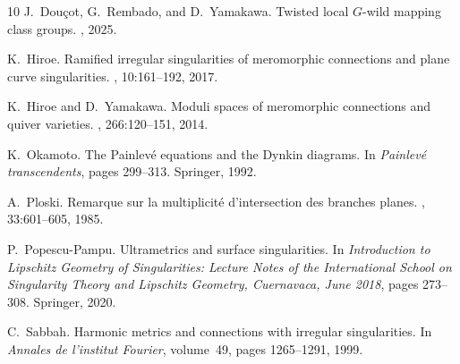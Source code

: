 \documentclass[11pt,a4paper]{amsart}
\numberwithin{equation}{section}
\begin{document}
\begin{thebibliography}{10}
J.~Dou{\c{c}}ot, G.~Rembado, and D.~Yamakawa.
\newblock Twisted local {$G$}-wild mapping class groups.
, 2025.

K.~Hiroe.
\newblock Ramified irregular singularities of meromorphic connections and plane
  curve singularities.
, 10:161--192, 2017.

K.~Hiroe and D.~Yamakawa.
\newblock Moduli spaces of meromorphic connections and quiver varieties.
, 266:120--151, 2014.

K.~Okamoto.
\newblock The {P}ainlev{\'e} equations and the {D}ynkin diagrams.
\newblock In {\em Painlev{\'e} transcendents}, pages 299--313. Springer, 1992.

A.~Ploski.
\newblock Remarque sur la multiplicit{\'e} d'intersection des branches planes.
, 33:601--605, 1985.

P.~Popescu-Pampu.
\newblock Ultrametrics and surface singularities.
\newblock In {\em Introduction to Lipschitz Geometry of Singularities: Lecture
  Notes of the International School on Singularity Theory and Lipschitz
  Geometry, Cuernavaca, June 2018}, pages 273--308. Springer, 2020.

C.~Sabbah.
\newblock Harmonic metrics and connections with irregular singularities.
\newblock In {\em Annales de l'institut Fourier}, volume~49, pages 1265--1291,
  1999.

\end{thebibliography}
\end{document}
